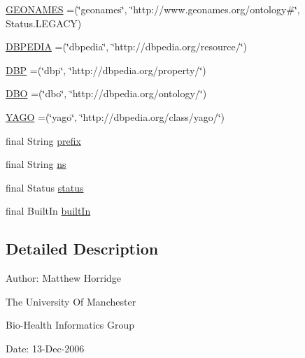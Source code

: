 \begin{DoxyCompactItemize}
\item 
\hyperlink{enumorg_1_1semanticweb_1_1owlapi_1_1vocab_1_1_namespaces_a82034d899a5122b1b7aa79ef1e8b7585}{G\-E\-O\-N\-A\-M\-E\-S} =(\char`\"{}geonames\char`\"{}, \char`\"{}http\-://www.\-geonames.\-org/ontology\#\char`\"{}, Status.\-L\-E\-G\-A\-C\-Y)
\item 
\hyperlink{enumorg_1_1semanticweb_1_1owlapi_1_1vocab_1_1_namespaces_a84d3c2f2ca5452fdcc748b7b36301c0b}{D\-B\-P\-E\-D\-I\-A} =(\char`\"{}dbpedia\char`\"{}, \char`\"{}http\-://dbpedia.\-org/resource/\char`\"{})
\item 
\hyperlink{enumorg_1_1semanticweb_1_1owlapi_1_1vocab_1_1_namespaces_a81c384af1306cdb6e16992077cb7ed2d}{D\-B\-P} =(\char`\"{}dbp\char`\"{}, \char`\"{}http\-://dbpedia.\-org/property/\char`\"{})
\item 
\hyperlink{enumorg_1_1semanticweb_1_1owlapi_1_1vocab_1_1_namespaces_a209365b93a48ae56e564d2b362c15e6f}{D\-B\-O} =(\char`\"{}dbo\char`\"{}, \char`\"{}http\-://dbpedia.\-org/ontology/\char`\"{})
\item 
\hyperlink{enumorg_1_1semanticweb_1_1owlapi_1_1vocab_1_1_namespaces_af6e6ce07a4b43e2529b00a98b5417179}{Y\-A\-G\-O} =(\char`\"{}yago\char`\"{}, \char`\"{}http\-://dbpedia.\-org/class/yago/\char`\"{})
\item 
final String \hyperlink{enumorg_1_1semanticweb_1_1owlapi_1_1vocab_1_1_namespaces_ab0b84686444b1712130cd555c9bfbbf4}{prefix}
\item 
final String \hyperlink{enumorg_1_1semanticweb_1_1owlapi_1_1vocab_1_1_namespaces_a88428054d2db7e7520b71b395aef20ac}{ns}
\item 
final Status \hyperlink{enumorg_1_1semanticweb_1_1owlapi_1_1vocab_1_1_namespaces_ae28791da010806ce31d87f0a53ba6bb7}{status}
\item 
final Built\-In \hyperlink{enumorg_1_1semanticweb_1_1owlapi_1_1vocab_1_1_namespaces_a7da60dac2579b84cd14c7846aefe0f44}{built\-In}
\end{DoxyCompactItemize}


\subsection{Detailed Description}
Author\-: Matthew Horridge\par
 The University Of Manchester\par
 Bio-\/\-Health Informatics Group\par
 Date\-: 13-\/\-Dec-\/2006\par
\par
 

